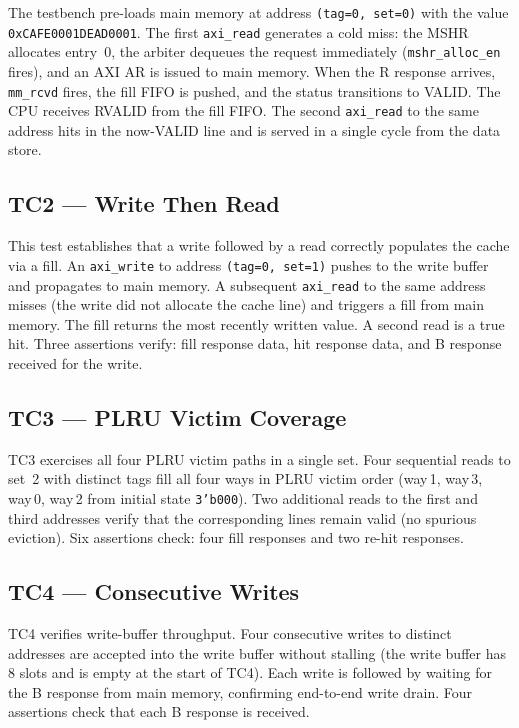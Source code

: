 \documentclass[12pt,letterpaper]{report}
\begin{document}
The testbench pre-loads main memory at address \texttt{(tag=0, set=0)}
with the value \texttt{0xCAFE0001DEAD0001}.  The first
\texttt{axi\_read} generates a cold miss: the MSHR allocates entry~0,
the arbiter dequeues the request immediately (\texttt{mshr\_alloc\_en}
fires), and an AXI AR is issued to main memory.  When the R response
arrives, \texttt{mm\_rcvd} fires, the fill FIFO is pushed, and the
status transitions to VALID.  The CPU receives RVALID from the fill
FIFO.  The second \texttt{axi\_read} to the same address hits in the
now-VALID line and is served in a single cycle from the data store.

\subsection{TC2 — Write Then Read}

This test establishes that a write followed by a read correctly
populates the cache via a fill.  An \texttt{axi\_write} to address
\texttt{(tag=0, set=1)} pushes to the write buffer and propagates to
main memory.  A subsequent \texttt{axi\_read} to the same address
misses (the write did not allocate the cache line) and triggers a fill
from main memory.  The fill returns the most recently written value.
A second read is a true hit.  Three assertions verify: fill response
data, hit response data, and B response received for the write.

\subsection{TC3 — PLRU Victim Coverage}

TC3 exercises all four PLRU victim paths in a single set.  Four
sequential reads to set~2 with distinct tags fill all four ways in
PLRU victim order (way\,1, way\,3, way\,0, way\,2 from initial state
\texttt{3'b000}).  Two additional reads to the first and third
addresses verify that the corresponding lines remain valid (no
spurious eviction).  Six assertions check: four fill responses and two
re-hit responses.

\subsection{TC4 — Consecutive Writes}

TC4 verifies write-buffer throughput.  Four consecutive writes to
distinct addresses are accepted into the write buffer without stalling
(the write buffer has 8 slots and is empty at the start of TC4).
Each write is followed by waiting for the B response from main memory,
confirming end-to-end write drain.  Four assertions check that each B
response is received.
\end{document}
